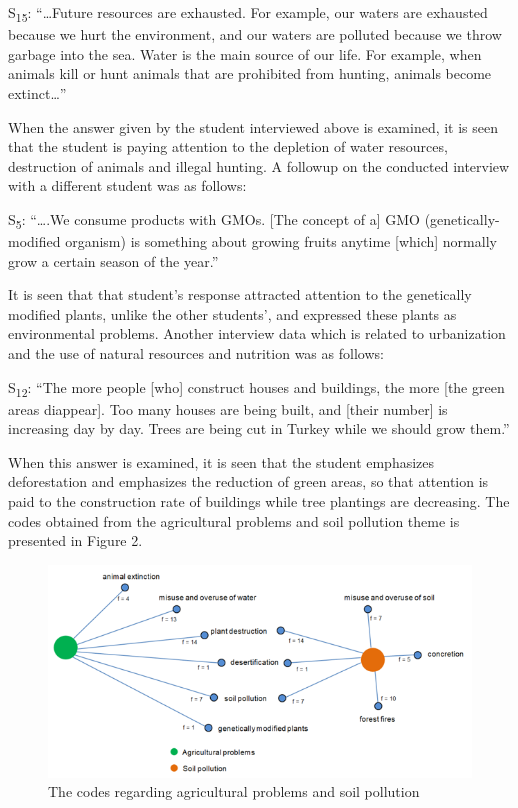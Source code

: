 \documentclass[11.5pt]{sig-alternate} %
\begin{document}
\begin{large}
S\textsubscript{15}: “…Future resources are exhausted. For example, our waters are exhausted because we hurt the environment, and our waters are polluted because we throw garbage into the sea. Water is the main source of our life. For example, when animals kill or hunt animals that are prohibited from hunting, animals become extinct…”

When the answer given by the student interviewed above is examined, it is seen that the student is paying attention to the depletion of water resources, destruction of animals and illegal hunting. A followup on the conducted interview with a different student was as follows:

S\textsubscript{5}: “….We consume products with GMOs. [The concept of a] GMO (genetically-modified organism) is something about growing fruits anytime [which] normally grow a certain season of the year.”

It is seen that that student’s response attracted attention to the genetically modified plants, unlike the other students’, and expressed these plants as environmental problems. Another interview data which is related to urbanization and the use of natural resources and nutrition was as follows: 

S\textsubscript{12}: “The more people [who] construct houses and buildings, the more [the green areas diappear]. Too many houses are being built, and [their number] is increasing day by day. Trees are being cut in Turkey while we should grow them.”

When this answer is examined, it is seen that the student emphasizes deforestation and emphasizes the reduction of green areas, so that attention is paid to the construction rate of buildings while tree plantings are decreasing. The codes obtained from the agricultural problems and soil pollution theme is presented in Figure 2.
 
\begin{figure}[tp]
    \centering
    \includegraphics[width=1\textwidth]{Fig2.png}
    \caption{The codes regarding agricultural problems and soil pollution}
\end{figure}


\end{large}
\end{document}
